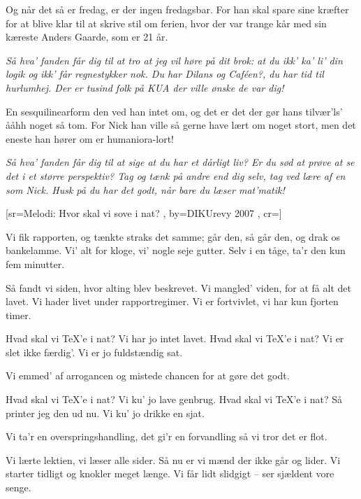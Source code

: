 \documentclass[pdftex,12pt]{article}
\begin{document}
\begin{songs}{}
\beginverse
Og når det så er fredag, er der ingen fredagsbar.
For han skal spare sine kræfter for at blive klar
til at skrive stil om ferien, hvor der var trange kår
med sin kæreste Anders Gaarde, som er 21 år.
\endverse

\beginverse
\emph{Så hva' fanden får dig til at tro at jeg vil høre på dit brok:
at du ikk' ka' li' din logik og ikk' får regnestykker nok.
Du har Dilans og Caféen?, du har tid til hurlumhej.
Der er tusind folk på KUA der ville ønske de var dig!}
\endverse

\beginverse
En sesquilinearform den ved han intet om,
og det er det der gør hans tilvær'ls' ååhh noget så tom.
For Nick han ville så gerne have lært om noget stort,
men det eneste han hører om er humaniora-lort!
\endverse

\beginverse
\emph{Så hva' fanden får dig til at sige at du har et dårligt liv?
Er du sød at prøve at se det i et større perspektiv?
Tag og tænk på andre end dig selv, tag ved lære af en som Nick.
Husk på du har det godt, når bare du læser mat'matik!}
\endverse
\endsong



[sr={Melodi: Hvor skal vi sove i nat?}
,
by={DIKUrevy 2007}
,
cr={}]\hypertarget{Hvad skal vi TeX'e i nat?}{}
\label{song69}

\beginverse
Vi fik rapporten, og tænkte straks det samme;
går den, så går den, og drak os bankelamme.
Vi' alt for kloge, vi' nogle seje gutter.
Selv i en tåge, ta'r den kun fem minutter.

\endverse
\beginverse
Så fandt vi siden, hvor alting blev beskrevet.
Vi mangled' viden, for at få alt det lavet.
Vi hader livet under rapportregimer.
Vi er fortvivlet, vi har kun fjorten timer.

\endverse
\beginverse
Hvad skal vi \TeX'e i nat?
Vi har jo intet lavet.
Hvad skal vi \TeX'e i nat?
Vi er slet ikke færdig'.
Vi er jo fuldstændig sat.

\endverse
\beginverse
Vi emmed' af arrogancen og mistede chancen
for at gøre det godt.

\endverse
\beginverse
Hvad skal vi \TeX'e i nat?
Vi ku' jo lave genbrug.
Hvad skal vi \TeX'e i nat?
Så printer jeg den ud nu.
Vi ku' jo drikke en sjat.

\endverse
\beginverse
Vi ta'r en overspringshandling, det gi'r en forvandling
så vi tror det er flot.

\endverse
\beginverse
Vi lærte lektien, vi læser alle sider.
Så nu er vi mænd der ikke går og lider.
Vi starter tidligt og knokler meget længe.
Vi får lidt slidgigt -- ser sjældent vore senge.


\end{songs}
\end{document}
